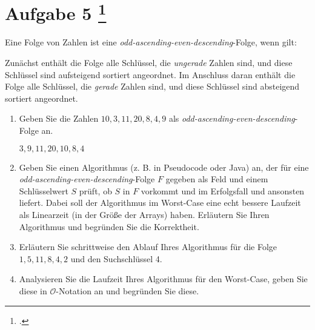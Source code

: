 \documentclass{lehramt-informatik-aufgabe}
\begin{document}
\section{Aufgabe 5
\footcite{66115:2020:09}}

Eine Folge von Zahlen ist eine
\emph{odd-ascending-even-descending}-Folge, wenn gilt:

Zunächst enthält die Folge alle Schlüssel, die \emph{ungerade} Zahlen
sind, und diese Schlüssel sind aufsteigend sortiert angeordnet. Im
Anschluss daran enthält die Folge alle Schlüssel, die \emph{gerade}
Zahlen sind, und diese Schlüssel sind absteigend sortiert angeordnet.

\begin{enumerate}
\item Geben Sie die Zahlen $10, 3, 11, 20, 8, 4, 9$ als
\emph{odd-ascending-even-descending}-Folge an.

\begin{liAntwort}
$3, 9, 11, 20, 10, 8, 4$
\end{liAntwort}

\item Geben Sie einen Algorithmus (z. B. in Pseudocode oder Java) an,
der für eine \emph{odd-ascending-even-descending}-Folge $F$ gegeben als
Feld und einem Schlüsselwert $S$ prüft, ob $S$ in $F$ vorkommt und
 im Erfolgsfall und ansonsten 
liefert. Dabei soll der Algorithmus im Worst-Case eine echt bessere
Laufzeit als Linearzeit (in der Größe der Arrays) haben. Erläutern Sie
Ihren Algorithmus und begründen Sie die Korrektheit.

\begin{liAntwort}

\end{liAntwort}


\item Erläutern Sie schrittweise den Ablauf Ihres Algorithmus für die
Folge $1, 5, 11, 8, 4, 2$ und
den Suchschlüssel 4.


\item Analysieren Sie die Laufzeit Ihres Algorithmus für den Worst-Case,
geben Sie diese in $\mathcal{O}$-Notation an und begründen Sie diese.

\end{enumerate}
\end{document}
